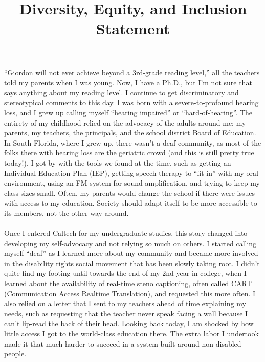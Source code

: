 \documentclass[10pt,a4paper,sans]{moderncv} %
\title{Diversity, Equity, and Inclusion Statement}
\begin{document}
\renewcommand*{\bibliographyhead}[1]{\section{#1}}
\makecvtitle %
\vspace*{-2em}

``Giordon will not ever achieve beyond a 3rd-grade reading level,'' all the teachers told my parents when I was young. Now, I have a Ph.D., but I'm not sure that says anything about my reading level. I continue to get discriminatory and stereotypical comments to this day. I was born with a severe-to-profound hearing loss, and I grew up calling myself ``hearing impaired'' or ``hard-of-hearing''. The entirety of my childhood relied on the advocacy of the adults around me: my parents, my teachers, the principals, and the school district Board of Education. In South Florida, where I grew up, there wasn't a deaf community, as most of the folks there with hearing loss are the geriatric crowd (and this is still pretty true today!). I got by with the tools we found at the time, such as getting an Individual Education Plan (IEP), getting speech therapy to ``fit in'' with my oral environment, using an FM system for sound amplification, and trying to keep my class sizes small. Often, my parents would change the school if there were issues with access to my education. Society should adapt itself to be more accessible to its members, not the other way around.
\\
\\
Once I entered Caltech for my undergraduate studies, this story changed into developing my self-advocacy and not relying so much on others. I started calling myself ``deaf'' as I learned more about my community and became more involved in the disability rights social movement that has been slowly taking root. I didn't quite find my footing until towards the end of my 2nd year in college, when I learned about the availability of real-time steno captioning, often called CART (Communication Access Realtime Translation), and requested this more often. I also relied on a letter that I sent to my teachers ahead of time explaining my needs, such as requesting that the teacher never speak facing a wall because I can't lip-read the back of their head. Looking back today, I am shocked by how little access I got to the world-class education there. The extra labor I undertook made it that much harder to succeed in a system built around non-disabled people.
\\
\end{document}
